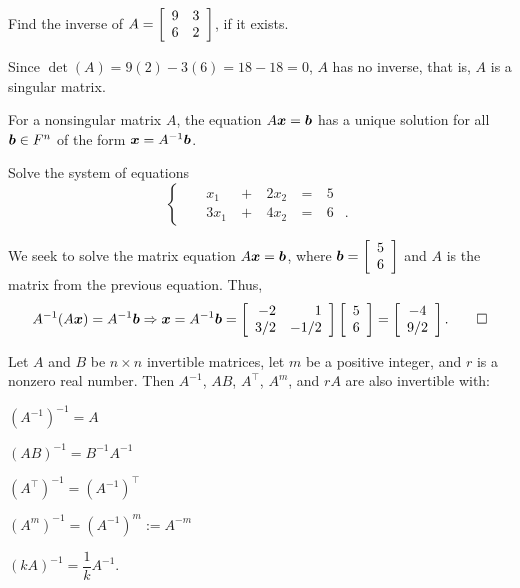 \begin{Exam} Find the inverse of $A = \mtx{rr}{9&3\\6&2}$, if it exists.

Since $\det(A)=9(2)-3(6) = 18-18=0$, $A$ has no inverse, that is, $A$ is a singular matrix.
\end{Exam}

For a nonsingular matrix $A$, the equation $A\bb x = \bb b$ has a unique solution for all $\bb b \in F^n$ of the form $\bb x = A^{-1}\bb b$.\\

\begin{Exam} Solve the system of equations 
\[\left\{\begin{alignedat}{100}
&&x_1\ &+\ &2x_2\ &=\ &5&\\
&&3x_1\ &+\ &4x_2\ &=\ &6&.
\end{alignedat}\right.\]

We seek to solve the matrix equation $A\bb x = \bb b$, where $\bb b = \vr{5\\6}$ and $A$ is the matrix from the previous equation. Thus, 
\[A^{-1}(A\bb x) = A^{-1}\bb b \Rightarrow \bb x = A^{-1}\bb b = \mtx{rr}{-2 & 1 \\ 3/2 & -1/2}\vr{5\\6} = \mtx{c}{-4\\9/2}.\qedhere\]
\end{Exam}\vs

\begin{Thm}\label{thm:inverseProps} Let $A$ and $B$ be $n\times n$ invertible matrices, let $m$ be a positive integer, and $r$ is a nonzero real number. Then $A^{-1}$, $AB$, $A^\top $, $A^m$, and $rA$ are also invertible with:\vspace{-0.1 in}
\begin{enumerate}[!THM!, start=1]
\begin{multicols}{3}
\item $(A^{-1})^{-1} = A$\\

\item $(AB)^{-1} = B^{-1}A^{-1}$\footnotemark[8]\\

\item $(A^\top )^{-1} = (A^{-1})^\top $\\
\end{multicols}\vspace{-25 pt}
\begin{multicols}{2}
\item $(A^m)^{-1} = (A^{-1})^m := A^{-m}$\\

\item $(kA)^{-1} = \dfrac{1}{k}A^{-1}$.\\
\end{multicols}
\end{enumerate}
\end{Thm}

